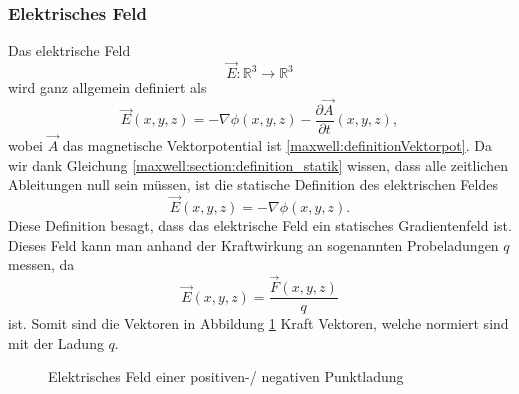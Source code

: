 \subsubsection{Elektrisches Feld}
Das elektrische Feld
\[
\vec{E}:\mathbb{R}^3 \rightarrow \mathbb{R}^3
\]
wird ganz allgemein definiert als
\begin{equation}
\vec{E}(x,y,z)
=
- \nabla\phi(x,y,z) - \frac{\partial \vec{A}}{\partial t}(x,y,z),
\label{maxwell:section:definiton_allgemein_elektrischesFeld}
\end{equation}
wobei $\vec{A}$ das magnetische Vektorpotential ist \eqref{maxwell:definitionVektorpot}.
Da wir dank Gleichung \eqref{maxwell:section:definition_statik} wissen, dass alle zeitlichen Ableitungen null sein müssen, ist die statische Definition des elektrischen Feldes
\begin{equation}
\vec{E}(x,y,z)
=
- \nabla\phi(x,y,z).
\label{maxwell:section:definition_statisch_elektrischesFeld}
\end{equation}
Diese Definition besagt, dass das elektrische Feld ein statisches Gradientenfeld ist.
Dieses Feld kann man anhand der Kraftwirkung an sogenannten Probeladungen $q$ messen, da
\[
\vec{E}(x,y,z)
=
\frac{\vec{F}(x,y,z)}{q}
\]
ist.
Somit sind die Vektoren in Abbildung \ref{maxwell:section:E-Feld_punktladung} Kraft Vektoren, welche normiert sind mit der Ladung $q$.
\begin{figure}[h]
	\centering
	\caption{Elektrisches Feld einer positiven-/ negativen Punktladung}
	\label{maxwell:section:E-Feld_punktladung}
\end{figure}

